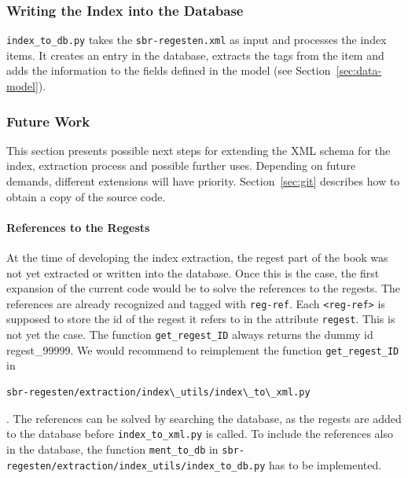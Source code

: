 \subsubsection{Writing the Index into the Database}
\texttt{index\_to\_db.py} takes the \texttt{sbr-regesten.xml} as input and processes the index items. It creates an entry in the database, extracts the tags from the item and adds the information to the fields defined in the model (see Section~\ref{sec:data-model}).




\subsubsection{Future Work}

This section presents possible next steps for extending the XML schema for the index, extraction process and possible further uses. Depending on future demands, different extensions will have priority. Section~\ref{sec:git} describes how to obtain a copy of the source code.

\paragraph{References to the Regests}
At the time of developing the index extraction, the regest part of the book was not yet extracted or written into the database. Once this is the case, the first expansion of the current code would be to solve the references to the regests. The references are already recognized and tagged with \texttt{reg-ref}. Each \texttt{<reg-ref>} is supposed to store the id of the regest it refers to in the attribute \texttt{regest}. This is not yet the case. The function \texttt{get\_regest\_ID} always returns the dummy id regest\_99999. We would recommend to reimplement the function \texttt{get\_regest\_ID} in 

\begin{verbatim}
sbr-regesten/extraction/index\_utils/index\_to\_xml.py
\end{verbatim}

. The references can be solved by searching the database, as the regests are added to the database before \texttt{index\_to\_xml.py} is called. To include the references also in the database, the function \texttt{ment\_to\_db} in \texttt{sbr-regesten/extraction/index\_utils/index\_to\_db.py} has to be implemented.

